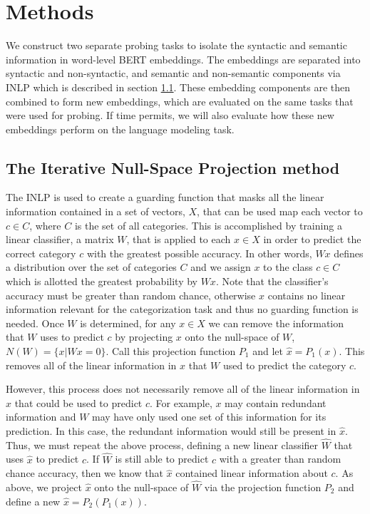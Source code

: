 \documentclass[11pt,a4paper]{article}
\begin{document}
\section{Methods}
\label{sec:method}

We construct two separate probing tasks to isolate the syntactic and semantic information in word-level BERT embeddings. The embeddings are separated into syntactic and non-syntactic, and semantic and non-semantic components via INLP which is described in section \ref{sec:inlp-method}. These embedding components are then combined to form new embeddings, which are evaluated on the same tasks that were used for probing. If time permits, we will also evaluate how these new embeddings perform on the language modeling task. 

\subsection{The Iterative Null-Space Projection method}
\label{sec:inlp-method}

The INLP is used to create a guarding function that masks all the linear information contained in a set of vectors, $X$, that can be used map each vector to $c \in C$, where $C$ is the set of all categories. This is accomplished by training a linear classifier, a matrix $W$, that is applied to each $x \in X$ in order to predict the correct category $c$ with the greatest possible accuracy. In other words, $Wx$ defines a distribution over the set of categories $C$ and we assign $x$ to the class $c \in C$ which is allotted the greatest probability by $Wx$. Note that the classifier's accuracy must be greater than random chance, otherwise $x$ contains no linear information relevant for the categorization task and thus no guarding function is needed. Once $W$ is determined, for any $x \in X$ we can remove the information that $W$ uses to predict $c$ by projecting $x$ onto the null-space of $W$, $N(W) = \{x | Wx=0\}$. Call this projection function $P_1$ and let $\hat{x} = P_1(x)$. This removes all of the linear information in $x$ that $W$ used to predict the category $c$. 

However, this process does not necessarily remove all of the linear information in $x$ that could be used to predict $c$. For example, $x$ may contain redundant information and $W$ may have only used one set of this information for its prediction. In this case, the redundant information would still be present in $\hat{x}$. Thus, we must repeat the above process, defining a new linear classifier $\hat{W}$ that uses $\hat{x}$  to predict $c$. If $\hat{W}$ is still able to predict $c$ with a greater than random chance accuracy, then we know that $\hat{x}$ contained linear information about $c$. As above, we project $\hat{x}$ onto the null-space of $\hat{W}$ via the projection function $P_2$ and define a new $\hat{x} = P_2(P_1(x))$.
\end{document}
